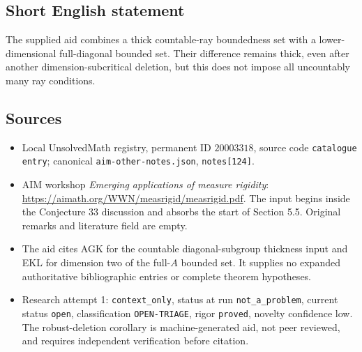\documentclass[11pt]{article}
\begin{document}
\subsection{Short English statement}
The supplied aid combines a thick countable-ray boundedness set with a lower-dimensional full-diagonal bounded set. Their difference remains thick, even after another dimension-subcritical deletion, but this does not impose all uncountably many ray conditions.
\subsection{Sources}
\begin{itemize}
\item Local UnsolvedMath registry, permanent ID $20003318$, source code \texttt{catalogue entry}; canonical \texttt{aim-other-notes.json}, \texttt{notes[124]}.
\item AIM workshop \emph{Emerging applications of measure rigidity}: \url{https://aimath.org/WWN/measrigid/measrigid.pdf}. The input begins inside the Conjecture 33 discussion and absorbs the start of Section 5.5. Original remarks and literature field are empty.
\item The aid cites AGK for the countable diagonal-subgroup thickness input and EKL for dimension two of the full-$A$ bounded set. It supplies no expanded authoritative bibliographic entries or complete theorem hypotheses.
\item Research attempt 1: \texttt{context\_only}, status at run \texttt{not\_a\_problem}, current status \texttt{open}, classification \texttt{OPEN-TRIAGE}, rigor \texttt{proved}, novelty confidence low. The robust-deletion corollary is machine-generated aid, not peer reviewed, and requires independent verification before citation.
\end{itemize}
\end{document}
